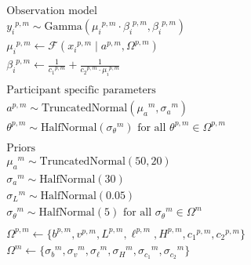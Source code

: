 \documentclass[a4paper,12pt]{article}
\begin{document}
\begin{align*}
    &\text{Observation model} \\
    &{y_i}^{p,m}\sim \text{Gamma}\left({\mu_i}^{p,m}\cdot{\beta_i}^{p,m}, {\beta_i}^{p,m}\right) \\
    &{\mu_i}^{p,m} \gets \mathcal{F}\left({x_i}^{p,m} \mid a^{p,m}, {\Omega}^{p,m}\right) \\
    &{\beta_i}^{p,m} \gets \frac{1}{{c_1}^{p,m}} + \frac{1}{{c_2}^{p,m}\cdot {\mu_i}^{p,m}}\\\\
    &\text{Participant specific parameters} \\
    &a^{p,m} \sim \text{TruncatedNormal}\left({\mu_a}^{m}, {\sigma_a}^{m}\right)\\
    &{\theta}^{p,m} \sim \text{HalfNormal}\left({\sigma_{\theta}}^{m}\right) \text{ for all } \theta^{p,m} \in {\Omega}^{p,m}\\\\
    &\text{Priors} \\
    & {\mu_a}^m \sim \text{TruncatedNormal}\left(50, 20\right)\\
    &{\sigma_a}^m \sim \text{HalfNormal}\left(30\right)\\
    &{\sigma_L}^{m} \sim \text{HalfNormal}\left(0.05\right)\\
    &{\sigma_\theta}^m \sim \text{HalfNormal}\left(5\right) \text{ for all } {\sigma_\theta}^m\in \Omega^m\\\\
    &{\Omega}^{p,m} \gets \{{b}^{p,m}, {v}^{p,m}, {L}^{p,m}, {\ell}^{p,m}, {H}^{p,m}, {c_1}^{p,m}, {c_2}^{p,m}\}\\
    &\Omega^m \gets \{{\sigma_{b}}^m, {\sigma_{v}}^m,  {\sigma_{\ell}}^m, {\sigma_{H}}^m, {\sigma_{c_1}}^m, {\sigma_{c_2}}^m\}
\end{align*}
\end{document}
